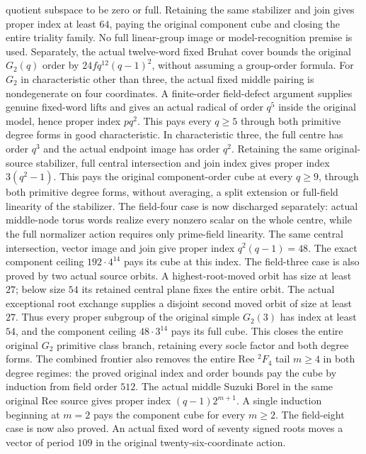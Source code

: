 quotient subspace to be zero or full. Retaining the same stabilizer and
join gives proper index at least $64$, paying the original component
cube and closing the entire triality family. No full linear-group image
or model-recognition premise is used.
Separately, the actual twelve-word fixed Bruhat
cover bounds the original $G_2(q)$ order by $24fq^{12}(q-1)^2$, without
assuming a group-order formula.
For $G_2$ in characteristic other than three, the actual fixed middle
pairing is nondegenerate on four coordinates. A finite-order field-defect
argument supplies genuine fixed-word lifts and gives an actual radical
of order $q^5$ inside the original model, hence proper index $pq^2$.
This pays every $q\geq5$ through both primitive degree forms in good
characteristic. In characteristic three, the full centre has order
$q^3$ and the actual endpoint image has order $q^2$. Retaining the same
original-source stabilizer, full central intersection and join index
gives proper index $3(q^2-1)$. This pays the original component-order
cube at every $q\geq9$, through both primitive degree forms, without
averaging, a split extension or full-field linearity of the stabilizer.
The field-four case is now discharged separately: actual middle-node
torus words realize every nonzero scalar on the whole centre, while the
full normalizer action requires only prime-field linearity. The same
central intersection, vector image and join give proper index
$q^2(q-1)=48$. The exact component ceiling $192\cdot4^{14}$ pays its cube
at this index. The field-three case is also proved by two actual source
orbits. A highest-root-moved orbit has size at least $27$; below size
$54$ its retained central plane fixes the entire orbit. The actual
exceptional root exchange supplies a disjoint second moved orbit of
size at least $27$. Thus every proper subgroup of the original simple
$G_2(3)$ has index at least $54$, and the component ceiling
$48\cdot3^{14}$ pays its full cube. This closes the entire original
$G_2$ primitive class branch, retaining every socle factor and both
degree forms. The combined frontier also removes the entire Ree
${}^2F_4$ tail $m\geq4$ in both degree regimes: the proved original
index and order bounds pay the cube by induction from field order $512$.
The actual middle Suzuki Borel in the same original Ree source gives
proper index $(q-1)2^{m+1}$. A single induction beginning at $m=2$ pays
the component cube for every $m\geq2$. The field-eight case is now
also proved. An actual fixed word of seventy signed roots moves a
vector of period $109$ in the original twenty-six-coordinate action.
